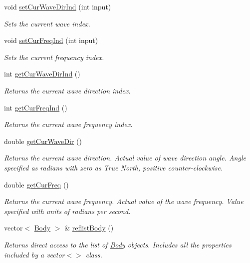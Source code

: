 \begin{DoxyCompactItemize}
void \hyperlink{class_system_a1bdee1bedde63db2d813fda1036f8299}{set\-Cur\-Wave\-Dir\-Ind} (int input)
\begin{DoxyCompactList}\small\item\em Sets the current wave index. \end{DoxyCompactList}\item 
void \hyperlink{class_system_a76c849ddc8e6d9cc628f4208df2ea950}{set\-Cur\-Freq\-Ind} (int input)
\begin{DoxyCompactList}\small\item\em Sets the current frequency index. \end{DoxyCompactList}\item 
int \hyperlink{class_system_aff94e0e384f1c55cccfa0f0238e445b8}{get\-Cur\-Wave\-Dir\-Ind} ()
\begin{DoxyCompactList}\small\item\em Returns the current wave direction index. \end{DoxyCompactList}\item 
int \hyperlink{class_system_ae348a554ad912c084343e96c3a7b8647}{get\-Cur\-Freq\-Ind} ()
\begin{DoxyCompactList}\small\item\em Returns the current wave frequency index. \end{DoxyCompactList}\item 
double \hyperlink{class_system_aea8c3cb08e84051a4325c06c5a7185fa}{get\-Cur\-Wave\-Dir} ()
\begin{DoxyCompactList}\small\item\em Returns the current wave direction. Actual value of wave direction angle. Angle specified as radians with zero as True North, positive counter-\/clockwise. \end{DoxyCompactList}\item 
double \hyperlink{class_system_ac4dec1ad6e8745d87f18dfb91bbd8f6b}{get\-Cur\-Freq} ()
\begin{DoxyCompactList}\small\item\em Returns the current wave frequency. Actual value of the wave frequency. Value specified with units of radians per second. \end{DoxyCompactList}\item 
vector$<$ \hyperlink{class_body}{Body} $>$ \& \hyperlink{class_system_a18bd5c0db7e2cf00404ee9791fa7344a}{reflist\-Body} ()
\begin{DoxyCompactList}\small\item\em Returns direct access to the list of \hyperlink{class_body}{Body} objects. Includes all the properties included by a vector$<$$>$ class. \end{DoxyCompactList}\item 

\end{DoxyCompactItemize}
